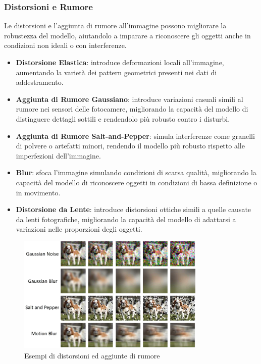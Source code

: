 \subsubsection{Distorsioni e Rumore}
Le distorsioni e l'aggiunta di rumore all'immagine possono migliorare la robustezza del modello, aiutandolo a imparare a riconoscere gli oggetti anche in condizioni non ideali o con interferenze.

\begin{itemize}
  \item \textbf{Distorsione Elastica}: introduce deformazioni locali all'immagine, aumentando la varietà dei pattern geometrici presenti nei dati di addestramento.
  \item \textbf{Aggiunta di Rumore Gaussiano}: introduce variazioni casuali simili al rumore nei sensori delle fotocamere, migliorando la capacità del modello di distinguere dettagli sottili e rendendolo più robusto contro i disturbi.
  \item \textbf{Aggiunta di Rumore Salt-and-Pepper}: simula interferenze come granelli di polvere o artefatti minori, rendendo il modello più robusto rispetto alle imperfezioni dell'immagine.
  \item \textbf{Blur}: sfoca l'immagine simulando condizioni di scarsa qualità, migliorando la capacità del modello di riconoscere oggetti in condizioni di bassa definizione o in movimento.
  \item \textbf{Distorsione da Lente}: introduce distorsioni ottiche simili a quelle causate da lenti fotografiche, migliorando la capacità del modello di adattarsi a variazioni nelle proporzioni degli oggetti.
\end{itemize}

\vspace{1cm}

\begin{figure}[ht]
    \centering
    \includegraphics[width=0.8\textwidth]{files/capitoli/3-data-augmentation/assets/distortion-noise.png}
    \caption{\label{fig:distortion-noise}Esempi di distorsioni ed aggiunte di rumore\cite{36}}
\end{figure}

